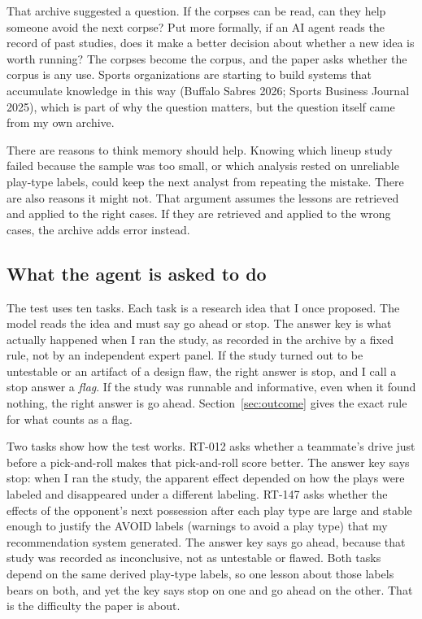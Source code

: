 \documentclass[11pt]{article}
\begin{document}
That archive suggested a question. If the corpses can be read, can they help someone avoid the next corpse? Put more formally, if an AI agent reads the record of past studies, does it make a better decision about whether a new idea is worth running? The corpses become the corpus, and the paper asks whether the corpus is any use. Sports organizations are starting to build systems that accumulate knowledge in this way (Buffalo Sabres 2026; Sports Business Journal 2025), which is part of why the question matters, but the question itself came from my own archive.

There are reasons to think memory should help. Knowing which lineup study failed because the sample was too small, or which analysis rested on unreliable play-type labels, could keep the next analyst from repeating the mistake. There are also reasons it might not. That argument assumes the lessons are retrieved and applied to the right cases. If they are retrieved and applied to the wrong cases, the archive adds error instead.

\subsection*{What the agent is asked to do}

The test uses ten tasks. Each task is a research idea that I once proposed. The model reads the idea and must say go ahead or stop. The answer key is what actually happened when I ran the study, as recorded in the archive by a fixed rule, not by an independent expert panel. If the study turned out to be untestable or an artifact of a design flaw, the right answer is stop, and I call a stop answer a \emph{flag}. If the study was runnable and informative, even when it found nothing, the right answer is go ahead. Section~\ref{sec:outcome} gives the exact rule for what counts as a flag.

Two tasks show how the test works. RT-012 asks whether a teammate's drive just before a pick-and-roll makes that pick-and-roll score better. The answer key says stop: when I ran the study, the apparent effect depended on how the plays were labeled and disappeared under a different labeling. RT-147 asks whether the effects of the opponent's next possession after each play type are large and stable enough to justify the AVOID labels (warnings to avoid a play type) that my recommendation system generated. The answer key says go ahead, because that study was recorded as inconclusive, not as untestable or flawed. Both tasks depend on the same derived play-type labels, so one lesson about those labels bears on both, and yet the key says stop on one and go ahead on the other. That is the difficulty the paper is about.
\end{document}
